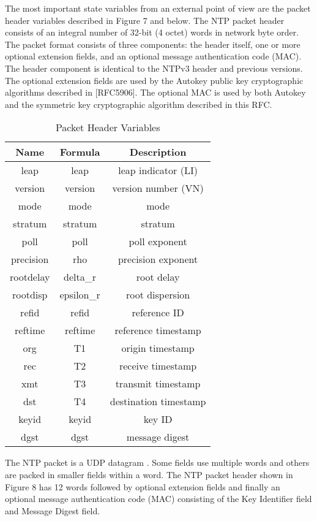 The most important state variables from an external point of view are
the packet header variables described in Figure 7 and below. The NTP
packet header consists of an integral number of 32-bit (4 octet)
words in network byte order. The packet format consists of three
components: the header itself, one or more optional extension fields,
and an optional message authentication code (MAC). The header
component is identical to the NTPv3 header and previous versions.
The optional extension fields are used by the Autokey public key
cryptographic algorithms described in [RFC5906]. The optional MAC is
used by both Autokey and the symmetric key cryptographic algorithm
described in this RFC.

\begin{table}[htb]
\center
\begin{tabular}{c | c | c}
Name & Formula & Description \\
\hline
\hline
leap & leap & leap indicator (LI) \\
version & version & version number (VN) \\
mode & mode & mode \\
stratum & stratum & stratum \\
poll & poll & poll exponent \\
precision & rho & precision exponent \\
rootdelay & delta\_r & root delay \\
rootdisp & epsilon\_r & root dispersion \\
refid & refid & reference ID \\
reftime & reftime & reference timestamp \\
org & T1 & origin timestamp \\
rec & T2 & receive timestamp \\
xmt & T3 & transmit timestamp \\
dst & T4 & destination timestamp \\
keyid & keyid & key ID \\
dgst & dgst & message digest \\
\hline
\end{tabular}
\label{packet_header_variables}
\caption{Packet Header Variables}
\end{table}

The NTP packet is a UDP datagram \cite{RFC0768}. Some fields use multiple
words and others are packed in smaller fields within a word. The NTP
packet header shown in Figure 8 has 12 words followed by optional
extension fields and finally an optional message authentication code
(MAC) consisting of the Key Identifier field and Message Digest
field.

